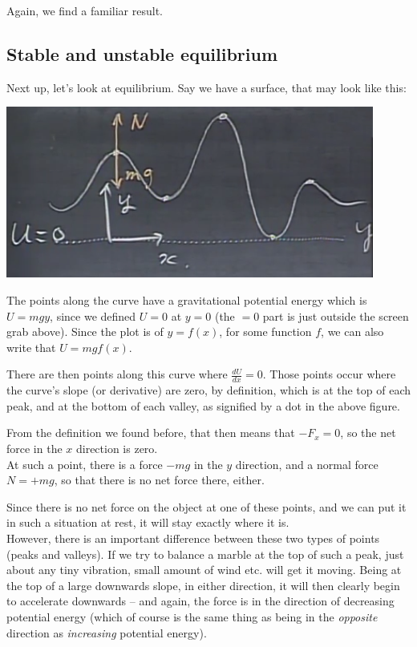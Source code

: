 \documentclass[12pt,a4paper]{report}
\begin{document}
Again, we find a familiar result.

\subsection{Stable and unstable equilibrium}

Next up, let's look at equilibrium. Say we have a surface, that may look like this:

\begin{center}
\includegraphics[scale=0.8]{Graphics/lec13_equilibrium}
\end{center}

The points along the curve have a gravitational potential energy which is $U = m g y$, since we defined $U = 0$ at $y = 0$ (the $= 0$ part is just outside the screen grab above). Since the plot is of $y = f(x)$, for some function $f$, we can also write that $U = m g f(x)$.

There are then points along this curve where $\displaystyle \frac{dU}{dx} = 0$. Those points occur where the curve's slope (or derivative) are zero, by definition, which is at the top of each peak, and at the bottom of each valley, as signified by a dot in the above figure.

From the definition we found before, that then means that $-F_x = 0$, so the net force in the $x$ direction is zero.\\
At such a point, there is a force $-m g$ in the $y$ direction, and a normal force $N = + m g$, so that there is no net force there, either.

Since there is no net force on the object at one of these points, and we can put it in such a situation at rest, it will stay exactly where it is.\\
However, there is an important difference between these two types of points  (peaks and valleys). If we try to balance a marble at the top of such a peak, just about any tiny vibration, small amount of wind etc. will get it moving. Being at the top of a large downwards slope, in either direction, it will then clearly begin to accelerate downwards -- and again, the force is in the direction of decreasing potential energy (which of course is the same thing as being in the \emph{opposite} direction as \emph{increasing} potential energy).
\end{document}
